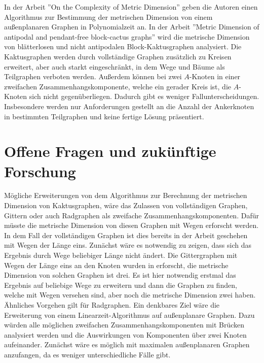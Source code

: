 In der Arbeit ''On the Complexity of Metric Dimension''\cite{aussenplanar} geben die Autoren einen Algorithmus zur Bestimmung der metrischen Dimension von einem außenplanaren Graphen in Polynomialzeit an. 
\newline\newline
In der Arbeit ''Metric Dimension of antipodal and pendant-free block-cactus graphs''\cite{cactusblock} wird die metrische Dimension von blätterlosen und nicht antipodalen Block-Kaktusgraphen analysiert. Die Kaktusgraphen werden durch vollständige Graphen zusätzlich zu Kreisen erweitert, aber auch starkt eingeschränkt, in dem Wege und Bäume als Teilgraphen verboten werden. Außerdem können bei zwei $A$-Knoten in einer zweifachen Zusammenhangskomponente, welche ein gerader Kreis ist, die $A$-Knoten sich nicht gegenüberliegen. Dadurch gibt es weniger Fallunterscheidungen. Insbesondere werden nur Anforderungen gestellt an die Anzahl der Ankerknoten in bestimmten Teilgraphen und keine fertige Lösung präsentiert.  
\section{Offene Fragen und zukünftige Forschung}
Mögliche Erweiterungen von dem Algorithmus zur Berechnung der metrischen Dimension von Kaktusgraphen, wäre das Zulassen von vollständigen Graphen, Gittern oder auch Radgraphen als zweifache Zusammenhangskomponenten. Dafür müsste die metrische Dimension von diesen Graphen mit Wegen erforscht werden. In dem Fall der vollständigen Graphen ist dies bereits in der Arbeit geschehen mit Wegen der Länge eins. Zunächst wäre es notwendig zu zeigen, dass sich das Ergebnis durch Wege beliebiger Länge nicht ändert. Die Gittergraphen mit Wegen der Länge eins an den Knoten wurden in \cite{grid} erforscht, die metrische Dimension von solchen Graphen ist drei. Es ist hier notwendig erstmal das Ergebnis auf beliebige Wege zu erweitern und dann die Graphen zu finden, welche mit Wegen versehen sind, aber noch die metrische Dimension zwei haben. Ähnliches Vorgehen gilt für Radgraphen.\newline
Ein denkbares Ziel wäre die Erweiterung von einem Linearzeit-Algorithmus auf außenplanare Graphen. Dazu würden alle möglichen zweifachen Zusammenhangskomponenten mit Brücken analysiert werden und die Auswirkungen von Komponenten über zwei Knoten aufeinander. Zunächst wäre es möglich mit maximalen außenplanaren Graphen anzufangen, da es weniger unterschiedliche Fälle gibt.

